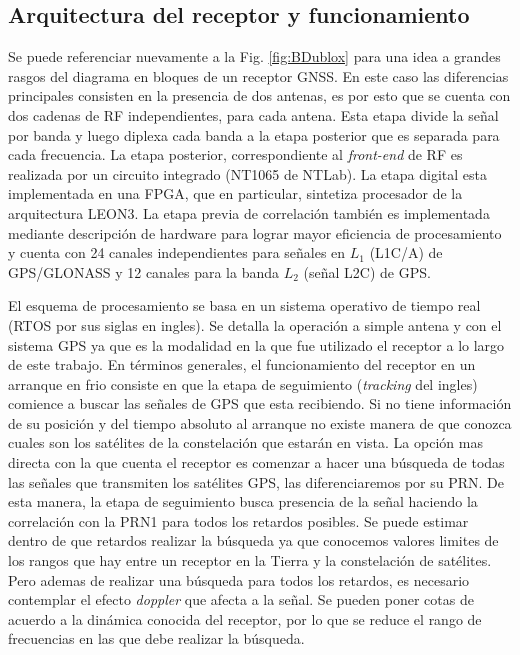 \documentclass[a4paper,12pt,oneside,onecolumn,final,openright]{book}%
\begin{document}
\subsection{Arquitectura del receptor y funcionamiento}
	Se puede referenciar nuevamente a la Fig. \ref{fig:BDublox} para una idea a grandes rasgos del diagrama en bloques de un receptor GNSS. En este caso las diferencias principales consisten en la presencia de dos antenas, es por esto que se cuenta con dos cadenas de RF independientes, para cada antena. Esta etapa divide la señal por banda y luego diplexa cada banda a la etapa posterior que es separada para cada frecuencia. La etapa posterior, correspondiente al \textit{front-end} de RF es realizada por un circuito integrado (NT1065 de NTLab). La etapa digital esta implementada en una FPGA, que en particular, sintetiza procesador de la arquitectura LEON3. La etapa previa de correlación también es implementada mediante descripción de hardware para lograr mayor eficiencia de procesamiento y cuenta con 24 canales independientes para señales en $L_1$ (L1C/A) de GPS/GLONASS y 12 canales para la banda $L_2$ (señal L2C) de GPS.

	El esquema de procesamiento se basa en un sistema operativo de tiempo real (RTOS por sus siglas en ingles). Se detalla la operación a simple antena y con el sistema GPS ya que es la modalidad en la que fue utilizado el receptor a lo largo de este trabajo. En términos generales, el funcionamiento del receptor en un arranque en frio consiste en que la etapa de seguimiento (\textit{tracking} del ingles) comience a buscar las señales de GPS que esta recibiendo. Si no tiene información de su posición y del tiempo absoluto al arranque no existe manera de que conozca cuales son los satélites de la constelación que estarán en vista. La opción mas directa con la que cuenta el receptor es comenzar a hacer una búsqueda de todas las señales que transmiten los satélites GPS, las diferenciaremos por su PRN. De esta manera, la etapa de seguimiento busca presencia de la señal haciendo la correlación con la PRN1 para todos los retardos posibles. Se puede estimar dentro de que retardos realizar la búsqueda ya que conocemos valores limites de los rangos que hay entre un receptor en la Tierra y la constelación de satélites. Pero ademas de realizar una búsqueda para todos los retardos, es necesario contemplar el efecto \textit{doppler} que afecta a la señal. Se pueden poner cotas de acuerdo a la dinámica conocida del receptor, por lo que se reduce el rango de frecuencias en las que debe realizar la búsqueda.
	
\end{document}
